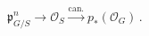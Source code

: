 \(
\mathfrak p^n_{G/S}
  \longrightarrow
\mathcal O_S
  \xrightarrow{\mathrm{can.}}
p_*(\mathcal O_G)\,.
\)
